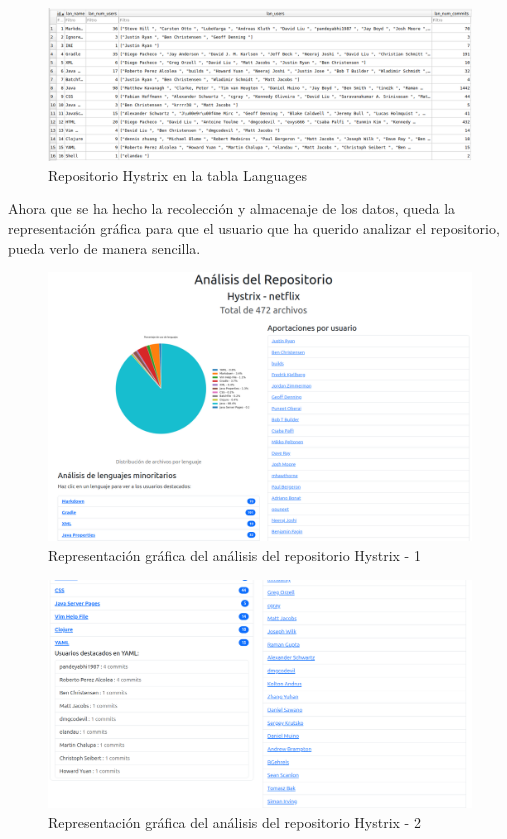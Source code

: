 \documentclass[a4paper, 12pt]{book}
\begin{document}
\begin{figure}[H]
  \centering
  \includegraphics[width=1\textwidth]{img/hystrixlanguages.png}
  \caption{Repositorio Hystrix en la tabla Languages}
  \label{figura:hystrixlanguages}
\end{figure}

Ahora que se ha hecho la recolección y almacenaje de los datos, queda la representación gráfica para que el usuario que ha querido analizar el repositorio, pueda verlo de manera sencilla.

\begin{figure}[H]
  \centering
  \includegraphics[width=1\textwidth]{img/analisishystrix.png}
  \caption{Representación gráfica del análisis del repositorio Hystrix - 1}
  \label{figura:analisishystrix1}
\end{figure}

\begin{figure}[H]
  \centering
  \includegraphics[width=1\textwidth]{img/analisishystrix2.png}
  \caption{Representación gráfica del análisis del repositorio Hystrix - 2}
  \label{figura:analisishystrix2}
\end{figure}
\end{document}
